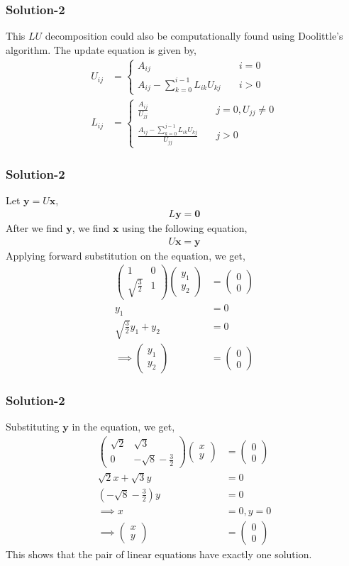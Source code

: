 \documentclass{beamer}
\providecommand{\brak}[1]{\ensuremath{\left(#1\right)}}
\theoremstyle{remark}
\newcommand{\myvec}[1]{\ensuremath{\begin{pmatrix}#1\end{pmatrix}}}
\let\vec\mathbf
\numberwithin{equation}{section}
\begin{document}
\begin{frame}
	\frametitle{Solution-2}
	This $LU$ decomposition could also be computationally found using Doolittle's algorithm. The update equation is given by,
\begin{align}
	U_{ij} &= \begin{cases}
		A_{ij} & \quad i = 0\\
		A_{ij} - \sum_{k = 0}^{i - 1} L_{ik} U_{kj} & \quad i > 0
	\end{cases}\\
	L_{ij} &= \begin{cases}
		\frac{A_{ij}}{U_{jj}} & \quad j = 0, U_{jj} \neq 0\\
		\frac{A_{ij} - \sum_{k = 0}^{j - 1} L_{ik} U_{kj}}{U_{jj}} & \quad j > 0
	\end{cases}
\end{align}
\end{frame}
\begin{frame}
	\frametitle{Solution-2}
	Let $\vec{y} = U\vec{x}$,
\begin{align}
	L\vec{y} = \vec{0}
\end{align}
After we find $\vec{y}$, we find $\vec{x}$ using the following equation,
\begin{align}
	U\vec{x} = \vec{y}
\end{align}
Applying forward substitution on the equation, we get,
\begin{align}
	\myvec{1 & 0\\\sqrt{\frac{3}{2}} & 1}\myvec{y_1\\y_2} &= \myvec{0\\0}\\
	y_1 &= 0\\
	\sqrt{\frac{3}{2}}y_1 + y_2 &= 0\\
	\implies \myvec{y_1\\y_2} &= \myvec{0\\0}
\end{align}
\end{frame}
\begin{frame}
	\frametitle{Solution-2}
	Substituting $\vec{y}$ in the equation, we get,
\begin{align}
	\myvec{\sqrt{2} & \sqrt{3}\\0 & -\sqrt{8} - \frac{3}{2}} \myvec{x\\y} &= \myvec{0\\0}\\
	\sqrt{2}x + \sqrt{3}y &= 0\\
	\brak{-\sqrt{8} - \frac{3}{2}}y &= 0\\
	\implies x &= 0, y = 0\\
	\implies \myvec{x\\y} &= \myvec{0\\0}
\end{align}
This shows that the pair of linear equations have exactly one solution.
\end{frame}
\end{document}
